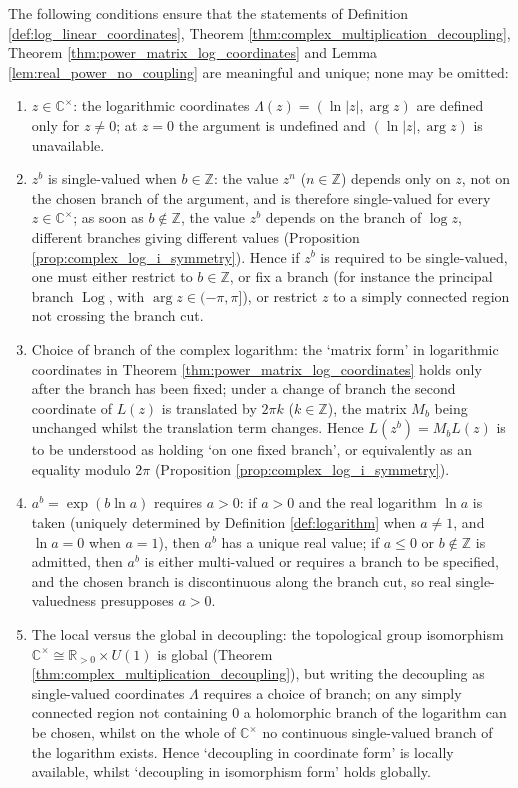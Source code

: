 \begin{property}\label{prop:power_preconditions}
The following conditions ensure that the statements of Definition \ref{def:log_linear_coordinates}, Theorem \ref{thm:complex_multiplication_decoupling}, Theorem \ref{thm:power_matrix_log_coordinates} and Lemma \ref{lem:real_power_no_coupling} are meaningful and unique; none may be omitted:
\begin{enumerate}[label=(\roman*)]
    \item $z\in\mathbb{C}^{\times}$: the logarithmic coordinates $\Lambda(z)=(\ln|z|,\arg z)$ are defined only for $z\neq0$; at $z=0$ the argument is undefined and $(\ln|z|,\arg z)$ is unavailable.
    \item $z^b$ is single-valued when $b\in\mathbb{Z}$: the value $z^n$ ($n\in\mathbb{Z}$) depends only on $z$, not on the chosen branch of the argument, and is therefore single-valued for every $z\in\mathbb{C}^{\times}$; as soon as $b\notin\mathbb{Z}$, the value $z^b$ depends on the branch of $\log z$, different branches giving different values (Proposition \ref{prop:complex_log_i_symmetry}). Hence if $z^b$ is required to be single-valued, one must either restrict to $b\in\mathbb{Z}$, or fix a branch (for instance the principal branch $\operatorname{Log}$, with $\arg z\in(-\pi,\pi]$), or restrict $z$ to a simply connected region not crossing the branch cut.
    \item Choice of branch of the complex logarithm: the `matrix form' in logarithmic coordinates in Theorem \ref{thm:power_matrix_log_coordinates} holds only after the branch has been fixed; under a change of branch the second coordinate of $L(z)$ is translated by $2\pi k$ ($k\in\mathbb{Z}$), the matrix $M_b$ being unchanged whilst the translation term changes. Hence $L(z^b)=M_bL(z)$ is to be understood as holding `on one fixed branch', or equivalently as an equality modulo $2\pi$ (Proposition \ref{prop:complex_log_i_symmetry}).
    \item $a^b=\exp(b\ln a)$ requires $a>0$: if $a>0$ and the real logarithm $\ln a$ is taken (uniquely determined by Definition \ref{def:logarithm} when $a\neq1$, and $\ln a=0$ when $a=1$), then $a^b$ has a unique real value; if $a\le0$ or $b\notin\mathbb{Z}$ is admitted, then $a^b$ is either multi-valued or requires a branch to be specified, and the chosen branch is discontinuous along the branch cut, so real single-valuedness presupposes $a>0$.
    \item The local versus the global in decoupling: the topological group isomorphism $\mathbb{C}^{\times}\cong\mathbb{R}_{>0}\times U(1)$ is global (Theorem \ref{thm:complex_multiplication_decoupling}), but writing the decoupling as single-valued coordinates $\Lambda$ requires a choice of branch; on any simply connected region not containing $0$ a holomorphic branch of the logarithm can be chosen, whilst on the whole of $\mathbb{C}^{\times}$ no continuous single-valued branch of the logarithm exists. Hence `decoupling in coordinate form' is locally available, whilst `decoupling in isomorphism form' holds globally.

\end{enumerate}
\end{property}
